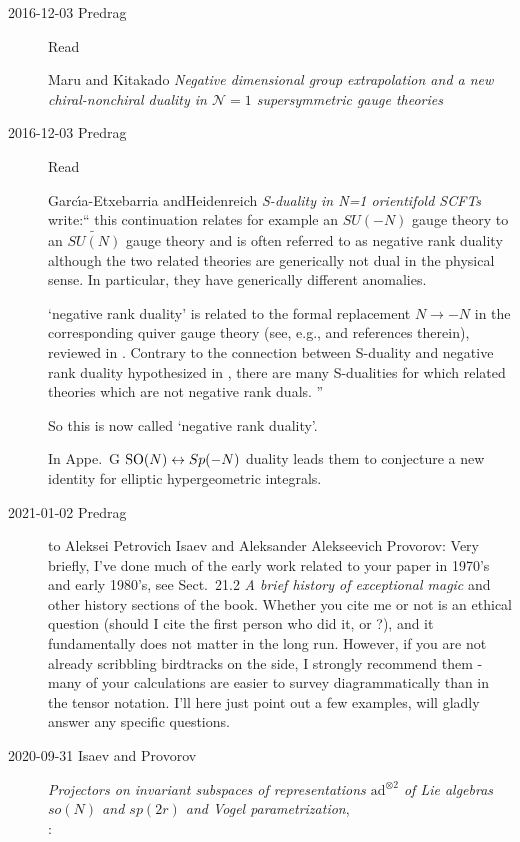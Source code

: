 \begin{description}
\item[2016-12-03 Predrag]
Read

Maru and Kitakado
{\em Negative dimensional group extrapolation and a new chiral-nonchiral
duality in ${\mathcal N} = 1$ supersymmetric gauge theories}

\item[2016-12-03 Predrag]
Read

Garc{\'{\i}}a-Etxebarria andHeidenreich
{\em S-duality in N=1 orientifold {SCFTs}} write:``
this continuation relates for example an $SU(-N)$ gauge theory to an
$\tilde{SU(N)}$ gauge theory and is often referred to as negative rank duality
although the two related theories are generically not dual in the physical
sense. In particular, they have generically different anomalies.

`negative rank duality' is related to the formal replacement $N \to -N$ in the
corresponding quiver gauge theory (see, e.g.,  and references
therein), reviewed in . Contrary to the connection between
S-duality and negative rank duality hypothesized in ,
there are many S-dualities for which related theories which are not negative
rank duals.
''

So this is now called `negative rank duality'.

In Appe.~G $\textrm{SO}(N) \leftrightarrow Sp(-N)$ duality leads them to conjecture
a new identity for elliptic hypergeometric integrals.

\item[2021-01-02 Predrag] to
{Aleksei Petrovich Isaev} and
Aleksander Alekseevich Provorov:
 Very briefly, I've done much of the early work related to
your paper in 1970's and early 1980's, see 
{Sect.~21.2} {\em A brief history of exceptional magic} and other
history sections of the book. Whether you cite me or not is an
ethical question (should I cite
{the first person who did it}, or ?),
and it fundamentally does not matter in the long run.
However, if you are not already scribbling birdtracks on the side, I
strongly recommend them - many of your calculations are easier to survey
diagrammatically than in the tensor notation. I'll here just point out a
few examples, will gladly answer any specific questions.

\item[2020-09-31 Isaev and Provorov]
{\em Projectors on invariant subspaces of representations
{$\mathrm{ad}^{\otimes 2}$} of {Lie} algebras ${so(N)}$ and {$sp(2r)$}
and {Vogel} parametrization},\\
:


\end{description}
